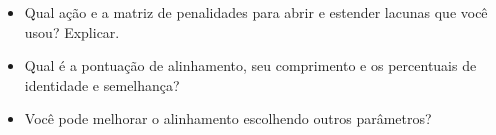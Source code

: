 \documentclass[letter,11pt]{book}
\begin{document}
{\color{red}
\begin{itemize}
\item Qual ação e a matriz de penalidades para abrir e estender lacunas que você usou? Explicar.
\item Qual é a pontuação de alinhamento, seu comprimento e os percentuais de identidade e semelhança?
\item Você pode melhorar o alinhamento escolhendo outros parâmetros?
\end{itemize}
}
%
%
%
%
%
%
%
%
\end{document}
